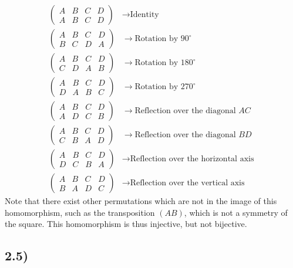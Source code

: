 $$
\begin{aligned}
\begin{pmatrix}
A & B & C & D \\
A & B & C & D
\end{pmatrix} & \rightarrow \text{Identity} \\
\begin{pmatrix}
A & B & C & D \\
B & C & D & A
\end{pmatrix} & \rightarrow \text{Rotation by } 90^\circ \\
\begin{pmatrix}
A & B & C & D \\
C & D & A & B
\end{pmatrix} & \rightarrow \text{Rotation by } 180^\circ \\
\begin{pmatrix}
A & B & C & D \\
D & A & B & C
\end{pmatrix} & \rightarrow \text{Rotation by } 270^\circ \\
\begin{pmatrix}
A & B & C & D \\
A & D & C & B
\end{pmatrix} & \rightarrow \text{Reflection over the diagonal } AC \\
\begin{pmatrix}
A & B & C & D \\
C & B & A & D
\end{pmatrix} & \rightarrow \text{Reflection over the diagonal } BD \\
\begin{pmatrix}
A & B & C & D \\
D & C & B & A
\end{pmatrix} & \rightarrow \text{Reflection over the horizontal axis } \\
\begin{pmatrix}
A & B & C & D \\
B & A & D & C
\end{pmatrix} & \rightarrow \text{Reflection over the vertical axis }
\end{aligned}
$$
Note that there exist other permutations which are not in the image of this homomorphism, such as the transposition $(A B)$, which is not a symmetry of the square. This homomorphism is thus injective, but not bijective.


\subsection*{2.5)}

